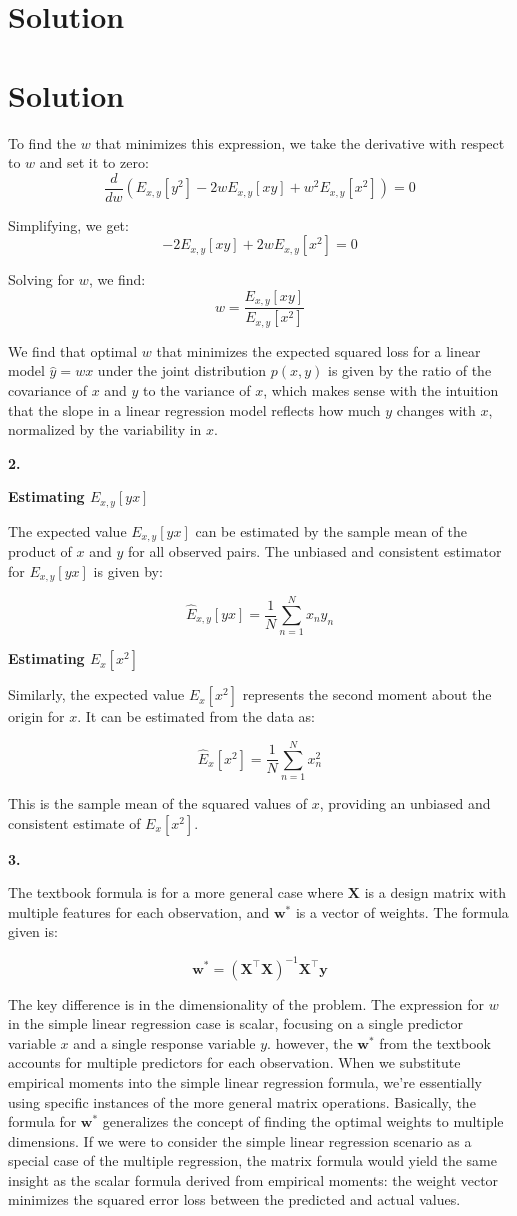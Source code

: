 \documentclass[submit]{harvardml}
\newenvironment{solution}
  {\color{blue}\section*{Solution}}
{}
\begin{document}
\begin{solution}
\begin{solution}
To find the \(w\) that minimizes this expression, we take the derivative with respect to \(w\) and set it to zero:
$$
\frac{d}{dw}(E_{x, y}[y^2] - 2wE_{x, y}[xy] + w^2E_{x, y}[x^2]) = 0
$$

Simplifying, we get:
$$
-2E_{x, y}[xy] + 2wE_{x, y}[x^2] = 0
$$

Solving for \(w\), we find:
$$
w = \frac{E_{x, y}[xy]}{E_{x, y}[x^2]}
$$

We find that optimal \(w\) that minimizes the expected squared loss for a linear model \(\hat{y} = wx\) under the joint distribution \(p(x, y)\) is given by the ratio of the covariance of \(x\) and \(y\) to the variance of \(x\), which makes sense with the intuition that the slope in a linear regression model reflects how much \(y\) changes with \(x\), normalized by the variability in \(x\).


\bigskip
\textbf{2.}

\textbf{Estimating \(E_{x, y}[yx]\)
}

The expected value \(E_{x, y}[yx]\) can be estimated by the sample mean of the product of \(x\) and \(y\) for all observed pairs. The unbiased and consistent estimator for \(E_{x, y}[yx]\) is given by:

$$
\hat{E}_{x, y}[yx] = \frac{1}{N} \sum_{n=1}^N x_n y_n
$$

\textbf{Estimating \(E_x[x^2]\)
}

Similarly, the expected value \(E_x[x^2]\) represents the second moment about the origin for \(x\). It can be estimated from the data as:

$$
\hat{E}_x[x^2] = \frac{1}{N} \sum_{n=1}^N x_n^2
$$

This is the sample mean of the squared values of \(x\), providing an unbiased and consistent estimate of \(E_x[x^2]\).

\bigskip
\textbf{3.}

The textbook formula is for a more general case where \(\mathbf{X}\) is a design matrix with multiple features for each observation, and \(\mathbf{w}^*\) is a vector of weights. The formula given is:

$$
\mathbf{w}^* = (\mathbf{X}^\top \mathbf{X})^{-1} \mathbf{X}^\top \mathbf{y}
$$

The key difference is in the dimensionality of the problem. The expression for \(w\) in the simple linear regression case is scalar, focusing on a single predictor variable \(x\) and a single response variable \(y\). however, the \(\mathbf{w}^*\) from the textbook accounts for multiple predictors for each observation.
When we  substitute empirical moments into the simple linear regression formula, we're essentially using specific instances of the more general matrix operations. Basically, the formula for \(\mathbf{w}^*\) generalizes the concept of finding the optimal weights to multiple dimensions. If we were to consider the simple linear regression scenario as a special case of the multiple regression, the matrix formula would yield the same insight as the scalar formula derived from empirical moments: the weight vector minimizes the squared error loss between the predicted and actual values.


\end{solution}
\end{solution}
\end{document}
